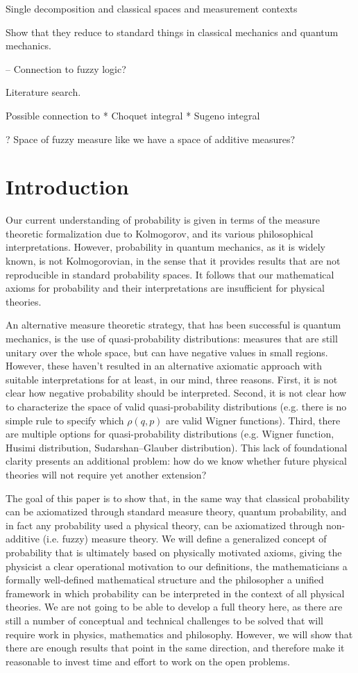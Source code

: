 \documentclass[10pt,twocolumn, nofootinbib]{revtex4-2}
\begin{document}
Single decomposition and classical spaces and measurement contexts

Show that they reduce to standard things in classical mechanics and quantum mechanics.

-- Connection to fuzzy logic?

Literature search.

Possible connection to
* Choquet integral
* Sugeno integral

? Space of fuzzy measure like we have a space of additive measures?


\section{Introduction}

Our current understanding of probability is given in terms of the measure theoretic formalization due to Kolmogorov, and its various philosophical interpretations. However, probability in quantum mechanics, as it is widely known, is not Kolmogorovian, in the sense that it provides results that are not reproducible in standard probability spaces. It follows that our mathematical axioms for probability and their interpretations are insufficient for physical theories.

An alternative measure theoretic strategy, that has been successful is quantum mechanics, is the use of quasi-probability distributions: measures that are still unitary over the whole space, but can have negative values in small regions. However, these haven't resulted in an alternative axiomatic approach with suitable interpretations for at least, in our mind, three reasons. First, it is not clear how negative probability should be interpreted. Second, it is not clear how to characterize the space of valid quasi-probability distributions (e.g. there is no simple rule to specify which $\rho(q,p)$ are valid Wigner functions). Third, there are multiple options for quasi-probability distributions (e.g. Wigner function, Husimi distribution, Sudarshan–Glauber distribution). This lack of foundational clarity presents an additional problem: how do we know whether future physical theories will not require yet another extension?

The goal of this paper is to show that, in the same way that classical probability can be axiomatized through standard measure theory, quantum probability, and in fact any probability used a physical theory, can be axiomatized through non-additive (i.e. fuzzy) measure theory. We will define a generalized concept of probability that is ultimately based on physically motivated axioms, giving the physicist a clear operational motivation to our definitions, the mathematicians a formally well-defined mathematical structure and the philosopher a unified framework in which probability can be interpreted in the context of all physical theories. We are not going to be able to develop a full theory here, as there are still a number of conceptual and technical challenges to be solved that will require work in physics, mathematics and philosophy. However, we will show that there are enough results that point in the same direction, and therefore make it reasonable to invest time and effort to work on the open problems.
\end{document}
